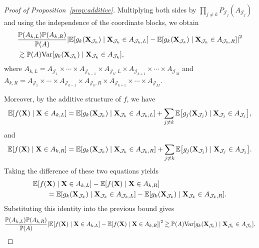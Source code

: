 \documentclass[11pt]{article}
\theoremstyle{plain}
\theoremstyle{definition}
\theoremstyle{remark}
\theoremstyle{plain}
\newcommand{\bX}{\mathbf{X}}
\DeclarePairedDelimiter{\bracks}{[}{]}
\DeclarePairedDelimiter{\abs}{|}{|}
\renewcommand{\P}{\mathbb{P}}
\newcommand{\E}{\mathbb{E}}
\newcommand{\Var}{\textnormal{Var}}
\newcommand{\1}{\mathbbm{1}}
\begin{document}
\begin{proof}[Proof of Proposition~\ref{prop:additive}]
    Multiplying both sides by $\prod_{j \neq k} P_{\mathcal{J}_j}(A_{\mathcal{J}_j})$ and using the independence of the coordinate blocks, we obtain
    \begin{equation*}
        \begin{split}
            &\frac{\P(A_{k,L})\P(A_{k,R})}{\P(A)}
            \abs*{ \E\bracks*{g_k(\bX_{\mathcal{J}_k}) \mid \bX_{\mathcal{J}_k} \in A_{\mathcal{J}_k,L}}
            - \E\bracks*{g_k(\bX_{\mathcal{J}_k}) \mid \bX_{\mathcal{J}_k} \in A_{\mathcal{J}_k,R}} }^2\\
            &\gtrsim \P(A) \Var\bracks*{g_k(\bX_{\mathcal{J}_k}) \mid \bX_{\mathcal{J}_k} \in A_{\mathcal{J}_k}},
        \end{split}
    \end{equation*}
    where $A_{k,L} = A_{\mathcal{J}_1} \times \cdots \times A_{\mathcal{J}_{k-1}} \times A_{\mathcal{J}_k,L} \times A_{\mathcal{J}_{k+1}} \times \cdots \times A_{\mathcal{J}_M}$
    and $A_{k,R} = A_{\mathcal{J}_1} \times \cdots \times A_{\mathcal{J}_{k-1}} \times A_{\mathcal{J}_k,R} \times A_{\mathcal{J}_{k+1}} \times \cdots \times A_{\mathcal{J}_M}$.

    Moreover, by the additive structure of $f$, we have
    \begin{equation*}
        \E\bracks*{f(\bX) \mid \bX \in A_{k,L}}
        = \E\bracks*{g_k(\bX_{\mathcal{J}_k}) \mid \bX_{\mathcal{J}_k} \in A_{\mathcal{J}_k,L}}
        + \sum_{j \neq k} \E\bracks*{g_j(\bX_{\mathcal{J}_j}) \mid \bX_{\mathcal{J}_j} \in A_{\mathcal{J}_j}},
    \end{equation*}
    and
    \begin{equation*}
        \E\bracks*{f(\bX) \mid \bX \in A_{k,R}}
        = \E\bracks*{g_k(\bX_{\mathcal{J}_k}) \mid \bX_{\mathcal{J}_k} \in A_{\mathcal{J}_k,R}}
        + \sum_{j \neq k} \E\bracks*{g_j(\bX_{\mathcal{J}_j}) \mid \bX_{\mathcal{J}_j} \in A_{\mathcal{J}_j}}.
    \end{equation*}
    Taking the difference of these two equations yields
    \begin{align*}
        &\E\bracks*{f(\bX) \mid \bX \in A_{k,L}}
        - \E\bracks*{f(\bX) \mid \bX \in A_{k,R}} \\
        &\qquad =
        \E\bracks*{g_k(\bX_{\mathcal{J}_k}) \mid \bX_{\mathcal{J}_k} \in A_{\mathcal{J}_k,L}}
        - \E\bracks*{g_k(\bX_{\mathcal{J}_k}) \mid \bX_{\mathcal{J}_k} \in A_{\mathcal{J}_k,R}}.
    \end{align*}
    Substituting this identity into the previous bound gives
    \begin{equation*}
        \frac{\P(A_{k,L})\P(A_{k,R})}{\P(A)}
        \abs*{ \E\bracks*{f(\bX) \mid \bX \in A_{k,L}} - \E\bracks*{f(\bX) \mid \bX \in A_{k,R}} }^2
        \gtrsim \P(A) \Var\bracks*{g_k(\bX_{\mathcal{J}_k}) \mid \bX_{\mathcal{J}_k} \in A_{\mathcal{J}_k}}.
    \end{equation*}


\end{proof}
\end{document}
